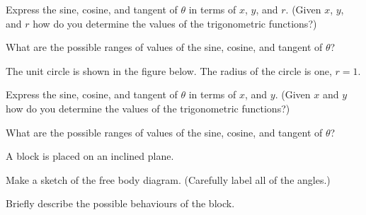 \begin{problem}
    \scalebox{0.35}{}

    \begin{subproblem}
    \item Express the sine, cosine, and tangent of $\theta$ in terms of
      $x$, $y$, and $r$. (Given $x$, $y$, and $r$ how do you determine
      the values of the trigonometric functions?)
      \vfill
    \item What are the possible ranges of values of the sine, cosine, and tangent
      of $\theta$?
      \vspace{8em}
    \end{subproblem}

    \clearpage


  \item The unit circle is shown in the figure below. The radius of the
    circle is one, $r=1$.

    \scalebox{0.35}{}

    \begin{subproblem}
    \item Express the sine, cosine, and tangent of $\theta$ in terms of
      $x$, and $y$. (Given $x$ and $y$ how do you determine the values
      of the trigonometric functions?)
      \vfill
    \item What are the possible ranges of values of the sine, cosine, and tangent
      of $\theta$?
      \vspace{8em}
    \end{subproblem}

    \item A block is placed on an inclined plane.

      \scalebox{0.35}{}

      \begin{subproblem}
        \item Make a sketch of the free body diagram. (Carefully label all of the angles.)
          \vfill
          \vfill
        \item Briefly describe the possible behaviours of the block.
          \vfill
      \end{subproblem}

\end{problem}




